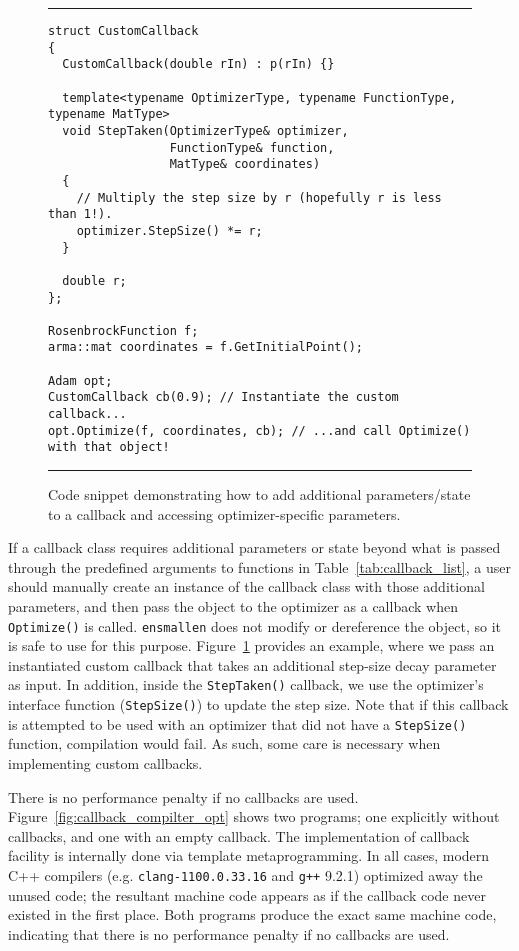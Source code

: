 \begin{figure}[b!]
\centering
\hrule
\vspace{1ex}
\begin{verbatim}
struct CustomCallback
{
  CustomCallback(double rIn) : p(rIn) {}

  template<typename OptimizerType, typename FunctionType, typename MatType>
  void StepTaken(OptimizerType& optimizer,
                 FunctionType& function,
                 MatType& coordinates)
  {
    // Multiply the step size by r (hopefully r is less than 1!).
    optimizer.StepSize() *= r;
  }

  double r;
};

RosenbrockFunction f;
arma::mat coordinates = f.GetInitialPoint();

Adam opt;
CustomCallback cb(0.9); // Instantiate the custom callback...
opt.Optimize(f, coordinates, cb); // ...and call Optimize() with that object!
\end{verbatim}
\hrule
\vspace*{-0.5em}
\caption
  {
  Code snippet demonstrating how to add additional parameters/state to a
callback and accessing optimizer-specific parameters.
  }
\label{fig:example_prog_callbacks_parameter}
\end{figure}

If a callback class requires additional parameters or state beyond what is
passed through the predefined arguments to functions in
Table~\ref{tab:callback_list}, a user should manually create an instance of the
callback class with those additional parameters, and then pass the object to the
optimizer as a callback when {\tt Optimize()} is called.  {\tt ensmallen} does
not modify or dereference the object, so it is safe to use for this purpose.
Figure~\ref{fig:example_prog_callbacks_parameter} provides an example,
where we pass an instantiated custom callback that takes an additional
step-size decay parameter as input.
In addition, inside the {\tt StepTaken()} callback, we use the
optimizer's interface function ({\tt StepSize()}) to update the step size.
Note that  if this callback is attempted to be used with an optimizer that
did not have a {\tt StepSize()} function, compilation would fail.
As such, some care is necessary when implementing custom callbacks.

There is no performance penalty if no callbacks are used.
Figure~\ref{fig:callback_compilter_opt} shows two programs;
one explicitly without callbacks, and one with an empty callback.
The implementation of callback facility is internally
done via template metaprogramming.
In all cases, modern C++ compilers (e.g. {\tt clang-1100.0.33.16} and {\tt g++} 9.2.1)
optimized away the unused code;
the resultant machine code appears as if the callback code never existed
in the first place.
Both programs produce the exact same machine code,
indicating that there is no performance penalty if no callbacks are used.

